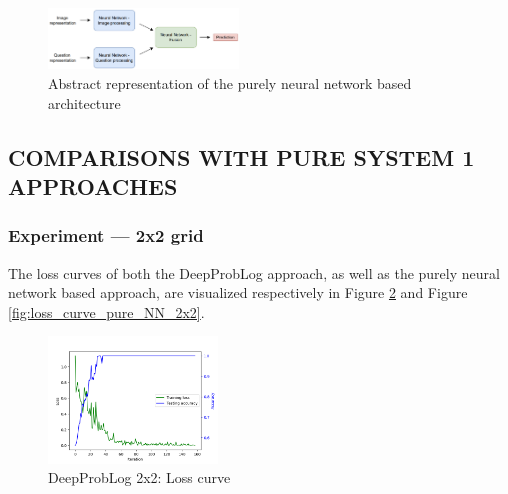 \documentclass[english]{sobraep}
\begin{document}
\begin{figure}[H]
    \begin{center}
    \includegraphics[width=0.45\textwidth]{pure_nn_architecture.png} 
    \captionsetup{justification=centering}
    \caption{Abstract representation of the purely neural network based architecture \cite{model_architecture}}
    \label{fig:pure_nn_network}
    \end{center}
\end{figure}

\subsection{COMPARISONS WITH PURE SYSTEM 1 APPROACHES}
\label{subsec:experiments_NN_vs_deepproblog}
\subsubsection{Experiment --- 2x2 grid}
The loss curves of both the DeepProbLog approach, as well as the purely neural network based approach, are visualized respectively in Figure \ref{fig:loss_curve_deepproblog_2x2} and Figure \ref{fig:loss_curve_pure_NN_2x2}.

\begin{figure}[htp]
    \begin{center}
    \includegraphics[width=0.40\textwidth]{loss_curve_deepproblog_2x2.png} 
    \captionsetup{justification=centering}
    \caption{DeepProbLog 2x2: Loss curve}
    \label{fig:loss_curve_deepproblog_2x2}
    \end{center}
\end{figure}
\end{document}
